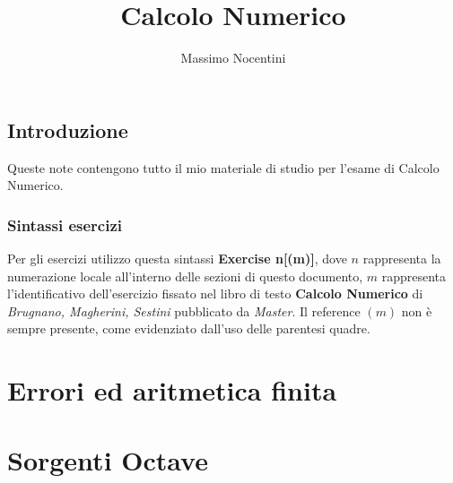 \documentclass[12pt, a4paper]{report}
\title{Calcolo Numerico}
\author{Massimo Nocentini}
\begin{document}
\lstset{
	language = octave
	, numbers = left 
	, basicstyle=\footnotesize
	, frame=single
	, tabsize=2
	, captionpos=b
	, breaklines=true
	, showspaces=false
	, showstringspaces=false
}

\maketitle

\tableofcontents

\newpage

\section*{Introduzione}
Queste note contengono tutto il mio materiale di studio per l'esame di Calcolo Numerico.

\subsection*{Sintassi esercizi}
Per gli esercizi utilizzo questa sintassi \textbf{Exercise n[(m)]}, dove $n$
rappresenta la numerazione locale all'interno delle sezioni di questo documento, 
$m$ rappresenta l'identificativo dell'esercizio fissato nel libro di testo 
\textbf{Calcolo Numerico} di \emph{Brugnano, Magherini, Sestini} pubblicato da \emph{Master}.
Il reference $(m)$ non \`e sempre presente, come evidenziato dall'uso delle parentesi quadre.

\chapter{Errori ed aritmetica finita}





\chapter{Sorgenti Octave}



\end{document}

